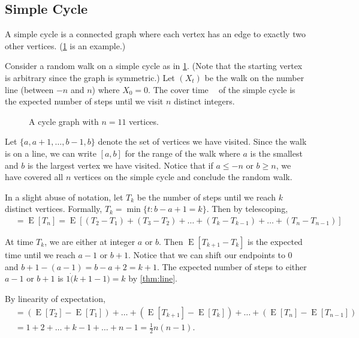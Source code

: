 \documentclass[12pt]{article}
\theoremstyle{definition}
\DeclareMathOperator{\E}{\mathrm{E}}		%
\DeclareMathOperator{\cov}{t_\textrm{cov}}  %
\begin{document}
\subsection{Simple Cycle}

A simple cycle is a connected graph where
each vertex has an edge to exactly two other vertices.
(\cref{fig:cycle} is an example.)

Consider a random walk on a simple cycle as in \cref{fig:cycle}.
(Note that the starting vertex is arbitrary since the graph is symmetric.)
Let $(X_t)$ be the walk on the number line (between $-n$ and $n$)
where $X_0 = 0$.
The cover time $\cov$ of the simple cycle is the expected number of steps 
until we visit $n$ distinct integers.

\begin{figure}[ht]
	\centering
	\caption{A cycle graph with $n=11$ vertices.}\label{fig:cycle}
\end{figure}

Let $\{a, a+1, \dots, b-1, b\}$ 
denote the set of vertices we have visited.
Since the walk is on a line, we can write $[a,b]$ for the range
of the walk where $a$ is the smallest 
and $b$ is the largest vertex we have visited.
Notice that if $a \leq -n$ or $b \geq n$, we have covered all $n$ vertices
on the simple cycle and conclude the random walk.

In a slight abuse of notation, let $T_k$ be the 
number of steps until we reach $k$ distinct vertices.
Formally, $T_k = \min\{t: b-a+1 = k\}$.
Then by telescoping,
\begin{align}
\cov &= \E[T_n] = \E[(T_2 - T_1) + (T_3 - T_2) + \dots + 
(T_k - T_{k-1}) + \dots + (T_n - T_{n-1})] \nonumber
\end{align}

At time $T_{k}$, we are either at integer $a$ or $b$.
Then $\E[T_{k+1}-T_{k}]$ is the expected time until we reach $a-1$ or $b+1$.
Notice that we can shift our endpoints to 0 and $b+1-(a-1) = b-a + 2 = k+1$.
The expected number of steps to either $a-1$ or $b+1$
is $1\dot (k+1-1) = k$ by \cref{thm:line}.

By linearity of expectation,
\begin{align}
\cov &=  (\E[T_2] - \E[T_1]) + \dots +
(\E[T_{k+1}] - \E[T_{k}]) + \dots + (\E[T_n] - \E[T_{n-1}]) \nonumber\\
&= 1 + 2 + \dots + k-1 + \dots + n-1  = \frac{1}{2}n(n-1). \nonumber
\end{align}
\end{document}
